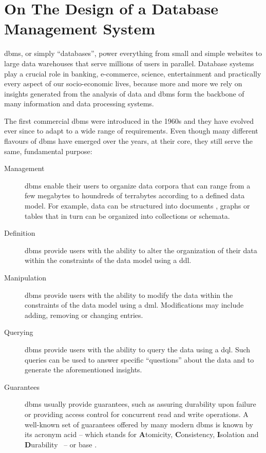 \chapter{On The Design of a Database Management System}
\label{chapter:theory_databases}


\acrfull{dbms}, or simply ``databases'', power everything from small and simple websites to large data warehouses that serve millions of users in parallel. Database systems play a crucial role in banking, e-commerce, science, entertainment and practically every aspect of our socio-economic lives, because more and more we rely on insights generated from the analysis of data \cite{Dhar:2013Data} and \acrshort{dbms} form the backbone of many information and data processing systems.

The first commercial \acrshort{dbms} were introduced in the 1960s \cite{Garcia:2009Database} and they have evolved ever since to adapt to a wide range of requirements. Even though many different flavours of \gls{dbms} have emerged over the years, at their core, they still serve the same, fundamental purpose:

\begin{description}
    \item[Management] \acrshort{dbms} enable their users to organize data corpora that can range from a few megabytes to houndreds of terrabytes according to a defined data model. For example, data can be structured into documents \cite{Hashem:2016Evaluating}, graphs \cite{Angles:2008Survey} or tables that in turn can be organized into collections or schemata.
    \item[Definition] \acrshort{dbms} provide users with the ability to alter the organization of their data within the constraints of the data model using a \acrfull{ddl}. 
    \item[Manipulation] \acrshort{dbms} provide users with the ability to modify the data within the constraints of the data model using a \acrfull{dml}. Modifications may include adding, removing or changing entries.
    \item[Querying] \acrshort{dbms} provide users with the ability to query the data using a \acrfull{dql}. Such queries can be used to answer specific ``questions'' about the data and to generate the aforementioned insights.
    \item[Guarantees] \acrshort{dbms} usually provide guarantees, such as assuring durability upon failure or providing access control for concurrent read and write operations. A well-known set of guarantees offered by many modern \acrshort{dbms} is known by its acronym \acrshort{acid} -- which stands for \textbf{A}tomicity, \textbf{C}onsistency, \textbf{I}solation and \textbf{D}urability~\cite{Haerder:1983principles} -- or \acrshort{base} \cite{Pritchett:2008Base}.
\end{description}

